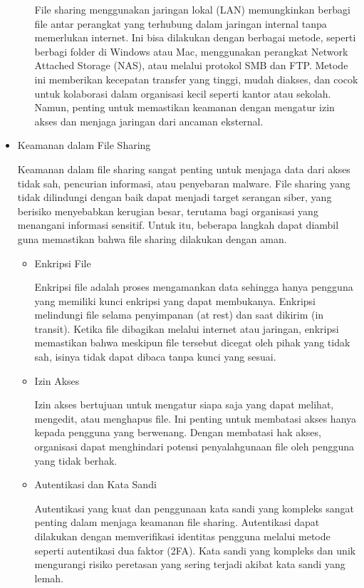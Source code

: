 \documentclass[12pt]{article}
\begin{document}
\begin{itemize}
\begin{itemize}
        File sharing menggunakan jaringan lokal (LAN) memungkinkan berbagi file antar perangkat yang terhubung dalam jaringan internal tanpa memerlukan internet. Ini bisa dilakukan dengan berbagai metode, seperti berbagi folder di Windows atau Mac, menggunakan perangkat Network Attached Storage (NAS), atau melalui protokol SMB dan FTP. Metode ini memberikan kecepatan transfer yang tinggi, mudah diakses, dan cocok untuk kolaborasi dalam organisasi kecil seperti kantor atau sekolah. Namun, penting untuk memastikan keamanan dengan mengatur izin akses dan menjaga jaringan dari ancaman eksternal.
    \end{itemize}
    \item Keamanan dalam File Sharing

    Keamanan dalam file sharing sangat penting untuk menjaga data dari akses tidak sah, pencurian informasi, atau penyebaran malware. File sharing yang tidak dilindungi dengan baik dapat menjadi target serangan siber, yang berisiko menyebabkan kerugian besar, terutama bagi organisasi yang menangani informasi sensitif. Untuk itu, beberapa langkah dapat diambil guna memastikan bahwa file sharing dilakukan dengan aman.
    \begin{itemize}
        \item Enkripsi File

        Enkripsi file adalah proses mengamankan data sehingga hanya pengguna yang memiliki kunci enkripsi yang dapat membukanya. Enkripsi melindungi file selama penyimpanan (at rest) dan saat dikirim (in transit). Ketika file dibagikan melalui internet atau jaringan, enkripsi memastikan bahwa meskipun file tersebut dicegat oleh pihak yang tidak sah, isinya tidak dapat dibaca tanpa kunci yang sesuai.
        \item Izin Akses

        Izin akses bertujuan untuk mengatur siapa saja yang dapat melihat, mengedit, atau menghapus file. Ini penting untuk membatasi akses hanya kepada pengguna yang berwenang. Dengan membatasi hak akses, organisasi dapat menghindari potensi penyalahgunaan file oleh pengguna yang tidak berhak.

        \item Autentikasi dan Kata Sandi

        Autentikasi yang kuat dan penggunaan kata sandi yang kompleks sangat penting dalam menjaga keamanan file sharing. Autentikasi dapat dilakukan dengan memverifikasi identitas pengguna melalui metode seperti autentikasi dua faktor (2FA). Kata sandi yang kompleks dan unik mengurangi risiko peretasan yang sering terjadi akibat kata sandi yang lemah.


\end{itemize}
\end{itemize}
\end{document}
